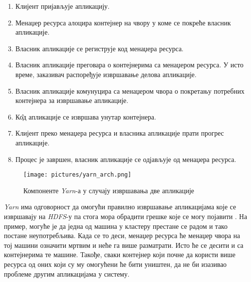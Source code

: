 \documentclass[12pt,oneside]{memoir}
\begin{document}
\begin{enumerate}
	\item Клијент пријављује апликацију.
	\item Менаџер ресурса алоцира контејнер на чвору у коме се покреће власник апликације.
	\item Власник апликације се региструје код менаџера ресурса.
	\item Власник апликације преговара о контејнерима са менаџером ресурса. У исто време, заказивач распоређује извршавање делова апликације.
	\item Власник апликације комунуцира са менаџером чвора о покретању потребних контејнера за извршавање апликације.
	\item К\^{о}д апликације се извршава унутар контејнера.
	\item Клијент преко менаџера ресурса и власника апликације прати прогрес апликације.
	\item Процес је завршен, власник апликације се одјављује од менаџера ресурса.
\end{enumerate}

\begin{figure}[!ht]
  \centering
  \texttt{[image: pictures/yarn\_arch.png]}
  \caption{Компоненте \textit{Yarn}-а у случају извршавања две апликације}
  \label{fig:yarn_ar}
\end{figure}


\textit{Yarn} има одговорност да омогући правилно извршавање апликацијама које се извршавају на \textit{HDFS}-у па стога мора обрадити грешке које се могу појавити \cite{hadoop_learning}. На пример, могуће је да једна од машина у кластеру престане се радом и тако постане неупотребљива. Када се то деси, менаџер ресурса ће менаџер чвора на тој машини означити мртвим и неће га више разматрати. Исто ће се десити и са контејнерима те машине. Такође, сваки контејнер који почне да користи више ресурса од оних који су му омогућени ће бити уништен, да не би изазивао проблеме другим апликацијама у систему.
\end{document}
